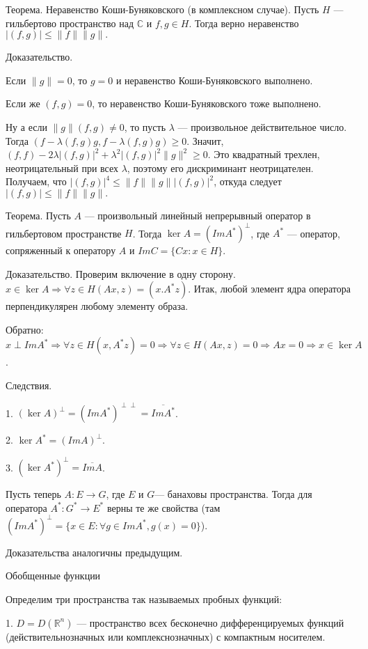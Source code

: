 \documentclass[12pt,titlepage, a4paper]{article}
\begin{document}
Теорема. Неравенство Коши-Буняковского (в комплексном случае).
Пусть $H$ --- гильбертово пространство над $\mathbb{C}$ и $f,g\in
H$. Тогда верно неравенство $|(f,g)|\leqslant \|f\|\|g\|.$

Доказательство.

Если $\|g\|=0$, то $g=0$ и неравенство Коши-Буняковского
выполнено.

Если же $(f,g)=0$, то неравенство Коши-Буняковского тоже
выполнено.

Ну а если $\|g\|(f,g)\neq0$, то пусть $\lambda$ --- произвольное
действительное число. Тогда
$(f-\lambda(f,g)g,f-\lambda(f,g)g)\geqslant 0.$ Значит,
$(f,f)-2\lambda|(f,g)|^2+\lambda^2|(f,g)|^2\|g\|^2\geqslant0.$ Это
квадратный трехлен, неотрицательный при всех $\lambda$, поэтому
его дискриминант неотрицателен. Получаем, что $|(f,g)|^4\leqslant
\|f\|\|g\||(f,g)|^2$, откуда следует $|(f,g)|\leqslant
\|f\|\|g\|.$

Теорема. Пусть $A$ --- произвольный линейный непрерывный оператор
в гильбертовом пространстве $H$. Тогда $\ker A=(Im A^*)^{\perp}$,
где $A^*$ --- оператор, сопряженный к оператору $A$ и $Im C=\{Cx:
x\in H\}$.

Доказательство. Проверим включение в одну сторону. $x\in \ker A
\Longrightarrow \forall z\in H (Ax,z)=(x.A^*z)$. Итак, любой
элемент ядра оператора перпендикулярен любому элементу образа.

Обратно: $x\perp ImA^*\Longrightarrow \forall z\in H (x,A^*z)=0
\Longrightarrow \forall z\in H (Ax,z)=0 \Longrightarrow Ax=0
\Longrightarrow x\in \ker A$.

Следствия.

1. $(\ker A)^{\perp}=(ImA^*)^{\perp\perp}=\overline{ImA^*}$.

2. $\ker A^*=(ImA)^{\perp}$.

3. $(\ker A^*)^{\perp}=\overline{ImA}$.

Пусть теперь $A\colon E\longrightarrow G$, где $E$ и $G$---
банаховы пространства. Тогда для оператора $A^*\colon
G^*\longrightarrow E^*$ верны те же свойства (там $(Im
A^*)^{\perp}=\{x\in E:\forall g\in Im A^*, g(x)=0\}$).

Доказательства аналогичны предыдущим.

\begin{center}
Обобщенные функции
\end{center}

Определим три пространства так называемых пробных функций:

1. $D=D(\mathbb{R}^n)$ --- пространство всех бесконечно
дифференцируемых функций (действительнозначных или
комплекснозначных) с компактным носителем.
\end{document}
